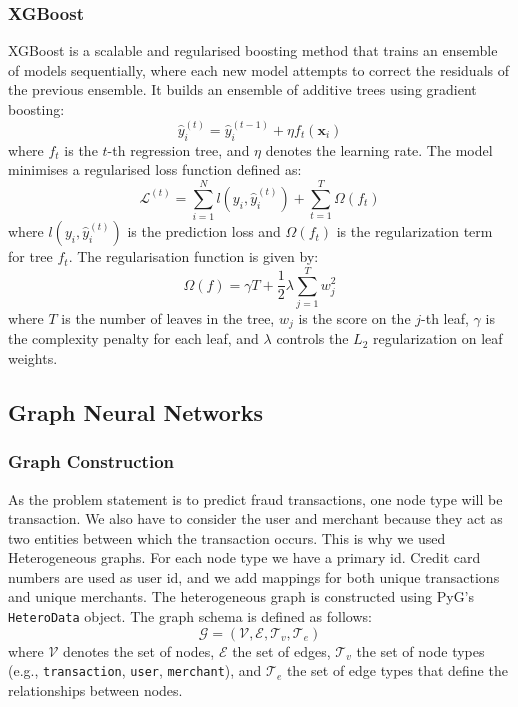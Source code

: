\documentclass[conference]{IEEEtran}
\begin{document}
\subsubsection{XGBoost}
XGBoost is a scalable and regularised boosting method that trains an ensemble of models sequentially, where each new model attempts to correct the residuals of the previous ensemble. It builds an ensemble of additive trees using gradient boosting:
\begin{equation}
    \hat{y}_i^{(t)} = \hat{y}_i^{(t-1)} + \eta f_t(\mathbf{x}_i)
    \label{eq:xgb-update}
\end{equation}
where $f_t$ is the $t$-th regression tree, and $\eta$ denotes the learning rate. The model minimises a regularised loss function defined as:
\begin{equation}
    \mathcal{L}^{(t)} = \sum_{i=1}^{N} l(y_i, \hat{y}_i^{(t)}) + \sum_{t=1}^{T} \Omega(f_t)
    \label{eq:regularized-loss}
\end{equation}
where $l(y_i, \hat{y}_i^{(t)})$ is the prediction loss and $\Omega(f_t)$ is the regularization term for tree $f_t$. The regularisation function is given by:
\begin{equation}
    \Omega(f) = \gamma T + \frac{1}{2} \lambda \sum_{j=1}^{T} w_j^2
    \label{eq:regularization}
\end{equation}
where $T$ is the number of leaves in the tree, $w_j$ is the score on the $j$-th leaf, $\gamma$ is the complexity penalty for each leaf, and $\lambda$ controls the $L_2$ regularization on leaf weights.




\subsection{Graph Neural Networks}
\subsubsection{Graph Construction}
As the problem statement is to predict fraud transactions, one node type will be transaction. We also have to consider the user and merchant because they act as two entities between which the transaction occurs. This is why we used Heterogeneous graphs. For each node type we have a primary id. Credit card numbers are used as user id, and we add mappings for both unique transactions and unique merchants. 
The heterogeneous graph is constructed using PyG's \texttt{HeteroData} object. The graph schema is defined as follows:
\begin{equation}
    \mathcal{G} = (\mathcal{V}, \mathcal{E}, \mathcal{T}_v, \mathcal{T}_e)
    \label{eq:hetero-graph}
\end{equation}
where $\mathcal{V}$ denotes the set of nodes, $\mathcal{E}$ the set of edges, $\mathcal{T}_v$ the set of node types (e.g., \texttt{transaction}, \texttt{user}, \texttt{merchant}), and $\mathcal{T}_e$ the set of edge types that define the relationships between nodes.
\end{document}

